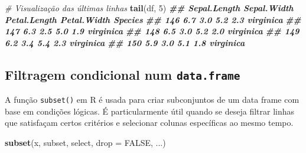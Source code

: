 \documentclass[
]{book}
\newenvironment{Shaded}{\begin{snugshade}}{\end{snugshade}}
\newcommand{\AttributeTok}[1]{\textcolor[rgb]{0.13,0.29,0.53}{#1}}
\newcommand{\CommentTok}[1]{\textcolor[rgb]{0.56,0.35,0.01}{\textit{#1}}}
\newcommand{\ConstantTok}[1]{\textcolor[rgb]{0.56,0.35,0.01}{#1}}
\newcommand{\DecValTok}[1]{\textcolor[rgb]{0.00,0.00,0.81}{#1}}
\newcommand{\DocumentationTok}[1]{\textcolor[rgb]{0.56,0.35,0.01}{\textbf{\textit{#1}}}}
\newcommand{\FunctionTok}[1]{\textcolor[rgb]{0.13,0.29,0.53}{\textbf{#1}}}
\newcommand{\NormalTok}[1]{#1}
\begin{document}
\begin{Shaded}
\begin{Highlighting}[]
\CommentTok{\# Visualização das últimas linhas}
\FunctionTok{tail}\NormalTok{(df, }\DecValTok{5}\NormalTok{)}
\DocumentationTok{\#\#     Sepal.Length Sepal.Width Petal.Length Petal.Width   Species}
\DocumentationTok{\#\# 146          6.7         3.0          5.2         2.3 virginica}
\DocumentationTok{\#\# 147          6.3         2.5          5.0         1.9 virginica}
\DocumentationTok{\#\# 148          6.5         3.0          5.2         2.0 virginica}
\DocumentationTok{\#\# 149          6.2         3.4          5.4         2.3 virginica}
\DocumentationTok{\#\# 150          5.9         3.0          5.1         1.8 virginica}
\end{Highlighting}
\end{Shaded}

\subsection{\texorpdfstring{Filtragem condicional num \texttt{data.frame}}{Filtragem condicional num data.frame}}\label{filtragem-condicional-num-data.frame}

A função \texttt{subset()} em R é usada para criar subconjuntos de um data
frame com base em condições lógicas. É particularmente útil quando se
deseja filtrar linhas que satisfaçam certos critérios e selecionar
colunas específicas ao mesmo tempo.

\begin{Shaded}
\begin{Highlighting}[]
\FunctionTok{subset}\NormalTok{(x, subset, select, }\AttributeTok{drop =} \ConstantTok{FALSE}\NormalTok{, ...)}
\end{Highlighting}
\end{Shaded}
\end{document}
